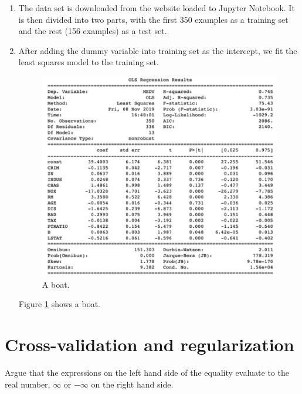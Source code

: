 \documentclass[11pt,a4paper]{article}
\begin{document}
\begin{enumerate}[1.]
\item 	
The data set is downloaded from the website loaded to Jupyter Notebook. It is then divided into two parts, with the first 350 examples as a training set and the rest (156 examples) as a test set.

\item
After adding the dummy variable into training set as the intercept, we fit the least squares model to the training set.

\begin{figure}
  \includegraphics[width=\linewidth]{figure1.png}
  \caption{A boat.}
  \label{fig:boat1}
\end{figure}

Figure \ref{fig:boat1} shows a boat.

\end{enumerate}

\section*{Cross-validation and regularization}

Argue that the expressions on the left hand side of the equality evaluate to the real number, $\infty$ or $-\infty$ on the right hand side.
\end{document}
